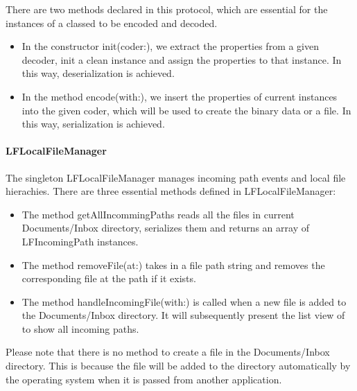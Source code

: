 \documentclass[12pt,a4paper]{article}
\renewcommand\texttt[1]{{\ttfamily\color{textttColor}#1}}
\begin{document}
                There are two methods declared in this protocol, which are essential for the instances of a classed to be encoded and decoded. 
                
                \begin{itemize}
                    \setlength\itemsep{-0.5em}
                    \item In the constructor \texttt{init(coder:)}, we extract the properties from a given decoder, init a clean instance and assign the properties to that instance. In this way, deserialization is achieved.
                    \item In the method \texttt{encode(with:)}, we insert the properties of current instances into the given coder, which will be used to create the binary data or a file. In this way, serialization is achieved.
                \end{itemize}
                
            \paragraph{LFLocalFileManager}
                The singleton \texttt{LFLocalFileManager} manages incoming path events and local file hierachies. There are three essential methods defined in \texttt{LFLocalFileManager}:
                
                \begin{itemize}
                    \setlength\itemsep{-0.5em}
                    \item The method \texttt{getAllIncommingPaths} reads all the files in current \texttt{Documents/Inbox} directory, serializes them and returns an array of \texttt{LFIncomingPath} instances.
                    \item The method \texttt{removeFile(at:)} takes in a file path string and removes the corresponding file at the path if it exists.
                    \item The method \texttt{handleIncomingFile(with:)} is called when a new file is added to the \texttt{Documents/Inbox} directory. It will subsequently present the list view of to show all incoming paths.
                \end{itemize}
                
                \clearpage
                Please note that there is no method to create a file in the \texttt{Documents/Inbox} directory. This is because the file will be added to the directory automatically by the operating system when it is passed from another application.
            
\end{document}
